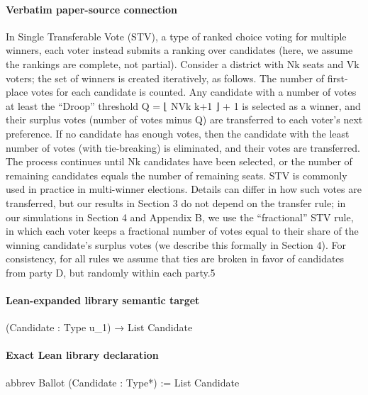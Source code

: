 \documentclass[10pt]{article}
\begin{document}
\paragraph{Verbatim paper-source connection}
\begin{ReviewVerbatim}
In Single Transferable Vote (STV), a type of ranked choice voting for multiple winners, each
voter instead submits a ranking over candidates (here, we assume the rankings are complete, not
partial). Consider a district with Nk seats and Vk voters; the set of winners is created iteratively, as
follows. The number of first-place votes for each candidate is counted. Any candidate with a number
of votes at least the “Droop” threshold Q = ⌊ NVk k+1 ⌋ + 1 is selected as a winner, and their surplus
votes (number of votes minus Q) are transferred to each voter’s next preference. If no candidate has
enough votes, then the candidate with the least number of votes (with tie-breaking) is eliminated,
and their votes are transferred. The process continues until Nk candidates have been selected, or
the number of remaining candidates equals the number of remaining seats. STV is commonly used
in practice in multi-winner elections.
    Details can differ in how such votes are transferred, but our results in Section 3 do not depend
on the transfer rule; in our simulations in Section 4 and Appendix B, we use the “fractional” STV
rule, in which each voter keeps a fractional number of votes equal to their share of the winning
candidate’s surplus votes (we describe this formally in Section 4). For consistency, for all rules we
assume that ties are broken in favor of candidates from party D, but randomly within each party.5
\end{ReviewVerbatim}

\paragraph{Lean-expanded library semantic target}
\begin{ReviewVerbatim}
(Candidate : Type u_1) → List Candidate
\end{ReviewVerbatim}

\paragraph{Exact Lean library declaration}
\begin{ReviewVerbatim}
abbrev Ballot (Candidate : Type*) := List Candidate
\end{ReviewVerbatim}
\end{document}
